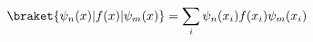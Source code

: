 % 
% 

\begin{equation}
  \braket{ \psi_{n}(x) | f(x) | \psi_{m}(x) } = \sum_{i} \psi_{n}(x_i) f(x_i) \psi_{m}(x_i)
\label{eq:dvr_expect}
\end{equation}

% 
